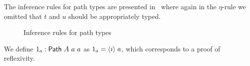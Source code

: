 The inference rules for path types are presented
in~ where again in the $\eta$-rule we omitted
that $t$ and $u$ should be appropriately typed.

\begin{figure}[h]
\begin{mdframed}
\end{mdframed}
\caption{Inference rules for path types}\label{pathtypes:rules}
\end{figure}

We define ${1_{a}} : {\sf Path}~A~a~a$ as ${1_{a}} = {\langle}i{\rangle} \; a$, which
corresponds to a proof of reflexivity.

